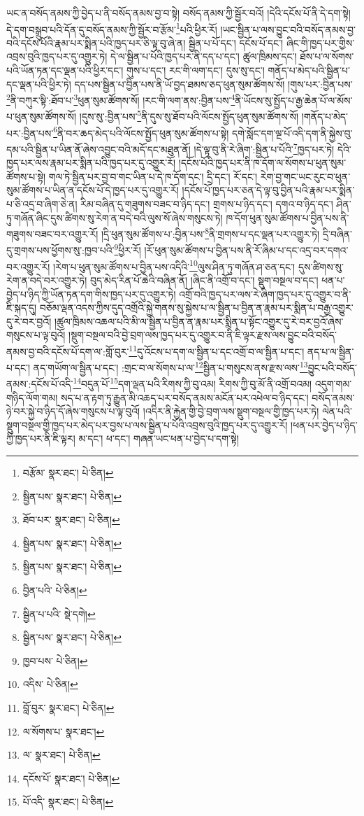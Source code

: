 ཡང་ན་བསོད་ནམས་ཀྱི་བྱེད་པ་ནི་བསོད་ནམས་བྱ་བ་སྟེ། བསོད་ནམས་ཀྱི་སྦྱོར་བའོ། །དེའི་དངོས་པོ་ནི་དེ་དག་སྟེ། དེ་དག་བསྒྲུབ་པའི་དོན་དུ་བསོད་ནམས་ཀྱི་སྦྱོར་བ་རྩོམ་\footnote{བརྩོམ་  སྣར་ཐང་།  པེ་ཅིན། }པའི་ཕྱིར་རོ། །ཡང་སྦྱིན་པ་ལས་བྱུང་བའི་བསོད་ནམས་བྱ་བའི་དངོས་པོའི་རྣམ་པར་སྨིན་པའི་ཁྱད་པར་ཅི་ལྟ་བུ་ཞེ་ན། སྦྱིན་པ་པོ་དང་། དངོས་པོ་དང་། ཞིང་གི་ཁྱད་པར་གྱིས་འབྲས་བུའི་ཁྱད་པར་དུ་འགྱུར་ཏེ། དེ་ལ་སྦྱིན་པ་པོའི་ཁྱད་པར་ནི་དད་པ་དང་། ཚུལ་ཁྲིམས་དང་། ཐོས་པ་ལ་སོགས་པའི་ཡོན་ཏན་དང་ལྡན་པའི་ཕྱིར་དང་། གུས་པ་དང་། རང་གི་ལག་དང་། དུས་སུ་དང་། གནོད་པ་མེད་པའི་སྦྱིན་པ་དང་ལྡན་པའི་ཕྱིར་ཏེ། དད་པས་སྦྱིན་པ་བྱིན་པས་ནི་ཡོ་བྱད་ཐམས་ཅད་ཕུན་སུམ་ཚོགས་སོ། །གུས་པར་:བྱིན་པས་\footnote{སྦྱིན་པས་  སྣར་ཐང་།  པེ་ཅིན། }ནི་བཀུར་སྟི་:ཐོབ་པ་\footnote{ཐོབ་པར་  སྣར་ཐང་།  པེ་ཅིན། }ཕུན་སུམ་ཚོགས་སོ། །རང་གི་ལག་ནས་:བྱིན་པས་\footnote{སྦྱིན་པས་  སྣར་ཐང་།  པེ་ཅིན། }ནི་ཡོངས་སུ་སྤྱོད་པ་རྒྱ་ཆེན་པོ་ལ་མོས་པ་ཕུན་སུམ་ཚོགས་སོ། །དུས་སུ་:བྱིན་པས་\footnote{སྦྱིན་པས་  སྣར་ཐང་།  པེ་ཅིན། }ནི་དུས་སུ་ཐོབ་པའི་ལོངས་སྤྱོད་ཕུན་སུམ་ཚོགས་སོ། །གནོད་པ་མེད་པར་:བྱིན་པས་\footnote{བྱིན་པའི་  པེ་ཅིན། }ནི་བར་ཆད་མེད་པའི་ལོངས་སྤྱོད་ཕུན་སུམ་ཚོགས་པ་སྟེ། དགེ་སློང་དག་ལྔ་པོ་འདི་དག་ནི་སྐྱེས་བུ་དམ་པའི་སྦྱིན་པ་ཡིན་ནོ་ཞེས་འབྱུང་བའི་མདོ་དང་མཐུན་ནོ། །དེ་ལྟ་བུ་ནི་རེ་ཞིག་:སྦྱིན་པ་པོའི་\footnote{སྦྱིན་པ་པའི་  སྡེ་དགེ། }ཁྱད་པར་ཏེ། དེའི་ཁྱད་པར་ལས་རྣམ་པར་སྨིན་པའི་ཁྱད་པར་དུ་འགྱུར་རོ། །དངོས་པོའི་ཁྱད་པར་ནི་ཁ་དོག་ལ་སོགས་པ་ཕུན་སུམ་ཚོགས་པ་སྟེ། གལ་ཏེ་སྦྱིན་པར་བྱ་བ་གང་ཡིན་པ་དེ་ཁ་དོག་དང་། དྲི་དང་། རོ་དང་། རེག་བྱ་གང་ཡང་རུང་བ་ཕུན་སུམ་ཚོགས་པ་ཡིན་ན་དངོས་པོ་དེ་ཁྱད་པར་དུ་འགྱུར་རོ། །དངོས་པོ་ཁྱད་པར་ཅན་དེ་ལྟ་བུ་བྱིན་པའི་རྣམ་པར་སྨིན་པ་ཅི་འདྲ་བ་ཞིག་ཅེ་ན། རིམ་བཞིན་དུ་གཟུགས་བཟང་བ་ཉིད་དང་། གྲགས་པ་ཉིད་དང་། དགའ་བ་ཉིད་དང་། ཤིན་ཏུ་གཞོན་ཞིང་དུས་ཚིགས་སུ་རེག་ན་བདེ་བའི་ལུས་སོ་ཞེས་གསུངས་ཏེ། ཁ་དོག་ཕུན་སུམ་ཚོགས་པ་བྱིན་པས་ནི་གཟུགས་བཟང་བར་འགྱུར་རོ། །དྲི་ཕུན་སུམ་ཚོགས་པ་:བྱིན་པས་\footnote{སྦྱིན་པས་  སྣར་ཐང་།  པེ་ཅིན། }ནི་གྲགས་པ་དང་ལྡན་པར་འགྱུར་ཏེ། དྲི་བཞིན་དུ་གྲགས་པས་ཕྱོགས་སུ་:ཁྱབ་པའི་\footnote{ཁྱབ་པས་  པེ་ཅིན། }ཕྱིར་རོ། །རོ་ཕུན་སུམ་ཚོགས་པ་བྱིན་པས་ནི་རོ་ཞིམ་པ་དང་འདྲ་བར་དགའ་བར་འགྱུར་རོ། །རེག་པ་ཕུན་སུམ་ཚོགས་པ་བྱིན་པས་འདིའི་\footnote{འདིས་  པེ་ཅིན། }ལུས་ཤིན་ཏུ་གཞོན་ཤ་ཅན་དང་། དུས་ཚིགས་སུ་རེག་ན་བདེ་བར་འགྱུར་ཏེ། བུད་མེད་རིན་པོ་ཆེའི་བཞིན་ནོ། །ཞིང་ནི་འགྲོ་བ་དང་། སྡུག་བསྔལ་བ་དང་། ཕན་པ་བྱེད་པ་ཉིད་ཀྱི་ཡོན་ཏན་དག་གིས་ཁྱད་པར་དུ་འགྱུར་ཏེ། འགྲོ་བའི་ཁྱད་པར་ལས་རེ་ཞིག་ཁྱད་པར་དུ་འགྱུར་བ་ནི་ཇི་སྐད་དུ། བཅོམ་ལྡན་འདས་ཀྱིས་དུད་འགྲོའི་སྐྱེ་གནས་སུ་སྐྱེས་པ་ལ་སྦྱིན་པ་བྱིན་ན་རྣམ་པར་སྨིན་པ་བརྒྱ་འགྱུར་དུ་རེ་བར་བྱའོ། །ཚུལ་ཁྲིམས་འཆལ་པའི་མི་ལ་སྦྱིན་པ་བྱིན་ན་རྣམ་པར་སྨིན་པ་སྟོང་འགྱུར་དུ་རེ་བར་བྱའོ་ཞེས་གསུངས་པ་ལྟ་བུའོ། །སྡུག་བསྔལ་བའི་བྱེ་བྲག་ལས་ཁྱད་པར་དུ་འགྱུར་བ་ནི་ཇི་ལྟར་རྫས་ལས་བྱུང་བའི་བསོད་ནམས་བྱ་བའི་དངོས་པོ་དག་ལ་:གློ་བུར་\footnote{བློ་བུར་  སྣར་ཐང་།  པེ་ཅིན། }དུ་འོངས་པ་དག་ལ་སྦྱིན་པ་དང་འགྲོ་བ་ལ་སྦྱིན་པ་དང་། ནད་པ་ལ་སྦྱིན་པ་དང་། ནད་གཡོག་ལ་སྦྱིན་པ་དང་། :གྲང་བ་ལ་སོགས་པ་ལ་\footnote{ལ་སོགས་པ་  སྣར་ཐང་། }སྦྱིན་པ་གསུངས་ནས་རྫས་ལས་\footnote{ལ་  སྣར་ཐང་།  པེ་ཅིན། }བྱུང་པའི་བསོད་ནམས་:དངོས་པོ་འདི་\footnote{དངོས་པོ་  སྣར་ཐང་།  པེ་ཅིན། }བདུན་པོ་\footnote{པོ་འདི་  སྣར་ཐང་།  པེ་ཅིན། }དག་ལྡན་པའི་རིགས་ཀྱི་བུ་འམ། རིགས་ཀྱི་བུ་མོ་ནི་འགྲོ་བའམ། འདུག་གམ་གཉིད་ལོག་གམ། སད་པ་ན་རྟག་ཏུ་རྒྱུན་མི་འཆད་པར་བསོད་ནམས་མངོན་པར་འཕེལ་བ་ཉིད་དང་། བསོད་ནམས་ཉེ་བར་སྐྱེ་བ་ཉིད་དོ་ཞེས་གསུངས་པ་ལྟ་བུའོ། །འདིར་ནི་རྐྱེན་གྱི་བྱེ་བྲག་ལས་སྡུག་བསྔལ་གྱི་ཁྱད་པར་ཏེ། ལེན་པའི་སྡུག་བསྔལ་གྱི་ཁྱད་པར་མེད་པར་བྱས་པ་ལས་སྦྱིན་པ་པོའི་འབྲས་བུའི་ཁྱད་པར་དུ་འགྱུར་རོ། །ཕན་པར་བྱེད་པ་ཉིད་ཀྱི་ཁྱད་པར་ནི་ཇི་ལྟར། མ་དང་། ཕ་དང་། གཞན་ཡང་ཕན་པ་བྱེད་པ་དག་སྟེ། 